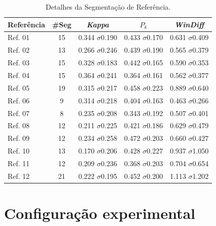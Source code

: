 \begin{table}[!h]
	\centering
 \begin{tabular}{|l|c|c|c|c|}

\hline
Referência  & \#Seg & \textit{Kappa}       & $P_k$                &  \textit{WinDiff}\\ \hline
Ref. 01     & 15    & 0.344  $\sigma$0.190 & 0.433  $\sigma$0.170 & 0.631  $\sigma$0.409 \\ \hline
Ref. 02     & 13    & 0.266  $\sigma$0.246 & 0.439  $\sigma$0.190 & 0.565  $\sigma$0.379 \\ \hline
Ref. 03     & 15    & 0.328  $\sigma$0.183 & 0.442  $\sigma$0.165 & 0.590  $\sigma$0.353 \\ \hline
Ref. 04     & 15    & 0.364  $\sigma$0.241 & 0.364  $\sigma$0.161 & 0.562  $\sigma$0.377 \\ \hline
Ref. 05     & 19    & 0.315  $\sigma$0.217 & 0.458  $\sigma$0.223 & 0.889  $\sigma$0.640 \\ \hline
Ref. 06     & 9     & 0.314  $\sigma$0.218 & 0.404  $\sigma$0.163 & 0.463  $\sigma$0.266 \\ \hline
Ref. 07     & 8     & 0.235  $\sigma$0.208 & 0.343  $\sigma$0.192 & 0.507  $\sigma$0.401 \\ \hline
Ref. 08     & 12    & 0.211  $\sigma$0.225 & 0.421  $\sigma$0.186 & 0.629  $\sigma$0.479 \\ \hline
Ref. 09     & 12    & 0.234  $\sigma$0.258 & 0.472  $\sigma$0.203 & 0.660  $\sigma$0.427 \\ \hline
Ref. 10     & 13    & 0.170  $\sigma$0.206 & 0.428  $\sigma$0.227 & 0.937  $\sigma$1.050 \\ \hline
Ref. 11     & 12    & 0.209  $\sigma$0.236 & 0.368  $\sigma$0.203 & 0.704  $\sigma$0.654 \\ \hline
Ref. 12     & 21    & 0.222  $\sigma$0.195 & 0.452  $\sigma$0.200 & 1.113  $\sigma$1.202 \\ \hline
 
\end{tabular}
\caption{Detalhes da Segmentação de Referência.}
\label{tab:detalhesSegRef}
\end{table}












\section{Configuração experimental}
\label{subsec:configuracaoexperimental}

